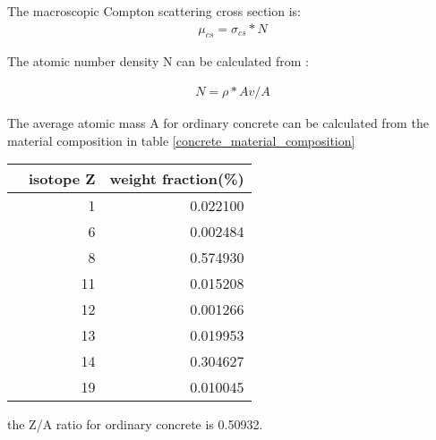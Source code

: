 \documentclass[paper=a4, fontsize=11pt]{article} %
\newcommand{\ra}[1]{\renewcommand{\arraystretch}{#1}}
\begin{document}
The macroscopic Compton scattering cross section is:
\begin{eqnarray}
\mu_{cs} = \sigma_{cs} * N
\end{eqnarray}

The atomic number density N can be calculated from :

\begin{eqnarray}
N = \rho * Av/ A
\end{eqnarray}

The average atomic mass A for ordinary concrete can be calculated from the material composition in table \ref{concrete_material_composition}

\begin{table*}\centering
\ra{1.3}
\begin{tabular}{@{}rrr@{}}\toprule
    & isotope Z & weight fraction(\%) \\ \midrule
    & 1         & 0.022100 \\
    & 6         & 0.002484 \\
    & 8         & 0.574930 \\
    & 11        & 0.015208 \\
    & 12        & 0.001266 \\
    & 13        & 0.019953 \\
    & 14        & 0.304627 \\
    & 19        & 0.010045 \\
\bottomrule
\end{tabular}
\caption{Ordinary concrete composition}
\label{concrete_material_composition}
\end{table*}

the Z/A ratio for ordinary concrete is 0.50932. 
\end{document}
